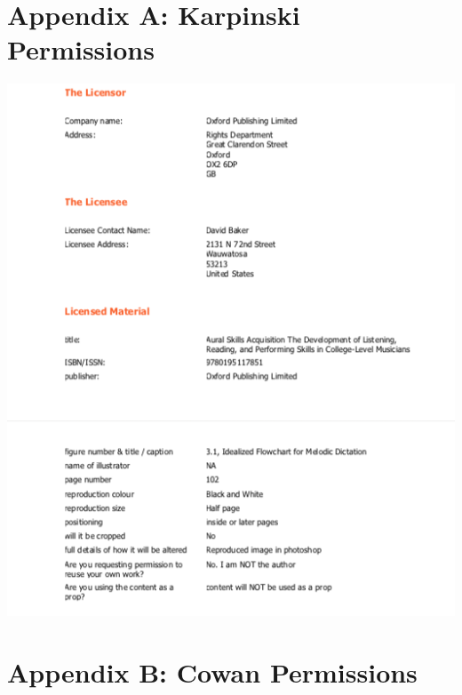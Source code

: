 \backmatter
\chapter{Appendix A: Karpinski Permissions}

\thispagestyle{empty}
\begin{center}
\includegraphics{img/karpinskipermission.png}
\end{center}

\chapter{Appendix B: Cowan Permissions}

